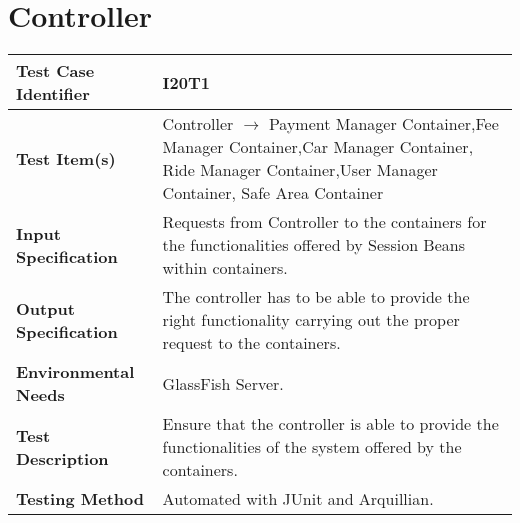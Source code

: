 \section{Controller}

\begin{tabular}{l p{}}
    \hline
    \textbf{Test Case Identifier} & I20T1\\
    \hline
    \textbf{Test Item(s)} & Controller $\rightarrow$ Payment Manager Container,Fee Manager Container,Car Manager Container, Ride Manager Container,User Manager Container, Safe Area Container\\
    \hline
    \textbf{Input Specification} & Requests from Controller to the containers for the functionalities offered by Session Beans within containers. \\
    \hline
    \textbf{Output Specification} &  The controller has to be able to provide the right functionality carrying out the proper request to the containers.\\
    \hline
    \textbf{Environmental Needs} & GlassFish Server. \\
    \hline
    \textbf{Test Description} & Ensure that the controller is able to provide the functionalities of the system offered by the containers.\\
    \hline
    \textbf{Testing Method} & Automated with JUnit and Arquillian.\\
    \hline
\end{tabular}